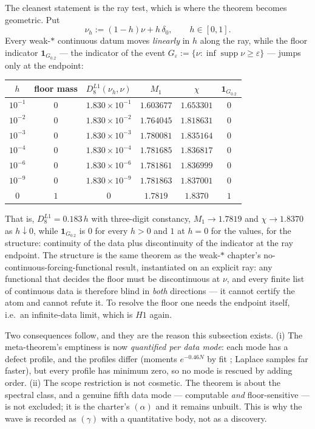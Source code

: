 The cleanest statement is the ray test, which is where the theorem becomes geometric. Put
\[
  \nu_h:=(1-h)\nu+h\,\delta_0,\qquad h\in[0,1].
  \label{eq:ray}
\]
Every weak-$*$ continuous datum moves \emph{linearly} in $h$ along the ray, while the floor
indicator $\mathbf 1_{G_{0.2}}$ --- the indicator of the event
$G_\varepsilon:=\{\nu:\inf\operatorname{supp}\nu\ge\varepsilon\}$ --- jumps only at the endpoint:
\begin{center}
\footnotesize
\begin{tabular}{@{}cccccc@{}}
\toprule
$h$ & floor mass & $D_8^{L1}(\nu_h,\nu)$ & $M_1$ & $\chi$ & $\mathbf 1_{G_{0.2}}$\\
\midrule
$10^{-1}$      & $0$ & $1.830\times10^{-1}$ & $1.603677$ & $1.653301$ & $0$\\
$10^{-2}$      & $0$ & $1.830\times10^{-2}$ & $1.764045$ & $1.818631$ & $0$\\
$10^{-3}$      & $0$ & $1.830\times10^{-3}$ & $1.780081$ & $1.835164$ & $0$\\
$10^{-4}$      & $0$ & $1.830\times10^{-4}$ & $1.781685$ & $1.836817$ & $0$\\
$10^{-6}$      & $0$ & $1.830\times10^{-6}$ & $1.781861$ & $1.836999$ & $0$\\
$10^{-9}$      & $0$ & $1.830\times10^{-9}$ & $1.781863$ & $1.837001$ & $0$\\
$0$            & $1$ & $0$                  & $1.7819$   & $1.8370$   & $1$\\
\bottomrule
\end{tabular}
\end{center}
That is, $D_8^{L1}=0.183\,h$ with three-digit constancy, $M_1\to1.7819$ and $\chi\to1.8370$ as
$h\downarrow0$, while $\mathbf 1_{G_{0.2}}$ is $0$ for every $h>0$ and $1$ at $h=0$ \LE{} for the
values, \LT{} for the structure: continuity of the data plus discontinuity of the indicator at the
ray endpoint. The structure is the same theorem as the weak-$*$ chapter's
no-continuous-forcing-functional result, instantiated on an explicit ray: any functional that
decides the floor must be discontinuous at $\nu$, and every finite list of continuous data is
therefore blind in \emph{both} directions --- it cannot certify the atom and cannot refute it. To
resolve the floor one needs the endpoint itself, i.e.\ an infinite-data limit, which is $H1$ again.

Two consequences follow, and they are the reason this subsection exists. (i) The meta-theorem's
emptiness is now \emph{quantified per data mode}: each mode has a defect profile, and the profiles
differ (moments $e^{-0.46N}$ by fit \LE; Laplace samples far faster), but every profile has minimum
zero, so no mode is rescued by adding order. (ii) The scope restriction is not cosmetic. The theorem
is about the spectral class, and a genuine fifth data mode --- computable \emph{and} floor-sensitive
--- is not excluded; it is the charter's $(\alpha)$ and it remains unbuilt. This is why the wave is
recorded as $(\gamma)$ with a quantitative body, not as a discovery.

